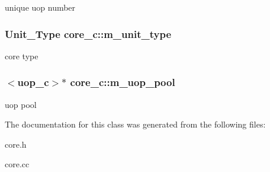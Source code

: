 \label{classcore__c_aebd17d803bc985fcc24c9c552286273c}
unique uop number \hypertarget{classcore__c_a0f67da58f3bcc6eb35040ec7b76c8e18}{
\subsubsection[{m\_\-unit\_\-type}]{\setlength{\rightskip}{0pt plus 5cm}Unit\_\-Type {\bf core\_\-c::m\_\-unit\_\-type}}}
\label{classcore__c_a0f67da58f3bcc6eb35040ec7b76c8e18}
core type \hypertarget{classcore__c_ad3c1d93713fb463bbde16f8dfa125de6}{
\subsubsection[{m\_\-uop\_\-pool}]{$<${\bf uop\_\-c}$>$$\ast$ {\bf core\_\-c::m\_\-uop\_\-pool}}}
\label{classcore__c_ad3c1d93713fb463bbde16f8dfa125de6}
uop pool 

The documentation for this class was generated from the following files:\begin{DoxyCompactItemize}
\item 
core.h\item 
core.cc\end{DoxyCompactItemize}
